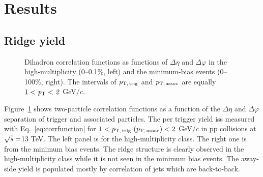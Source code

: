 
\section {Results}
\label{sec:results}

\subsection{Ridge yield}

\begin{figure}[h!]
	\centering
	\caption{ Dihadron correlation functions as functions of $\Delta\eta$ and $\Delta\varphi$ in the high-multiplicity (0--0.1\%, left) and the minimum-bias events (0--100\%, right). The intervals of $p_\mathrm{T,\,trig}$ and $p_\mathrm{T,\,assoc}$ are equally $1 < \it{p}_{\rm{T}} < 2$ GeV/$c$. }
	\label{fig:PlotCorrMBHMT}
\end{figure}

Figure~\ref{fig:PlotCorrMBHMT} shows two-particle correlation functions as a function of the $\Delta \eta$ and $\Delta \varphi$ separation of trigger and associated particles. The per trigger yield iss measured with Eq.~\ref{eq:corrfunction} for $1 < p_\mathrm{T,\,trig}~\mathrm (p_\mathrm{T,\,assoc}) < 2$ GeV/$c$ in pp collisions at $\sqrt{\it{s}} = $\unit{13} {\rm{}TeV}. The left panel is for the high-multiplicity class. The right one is from the minimum bias events. The ridge structure is clearly observed in the high-multiplicity class while it is not seen in the minimum bias events. The away-side yield is populated mostly by correlation of jets which are back-to-back.

